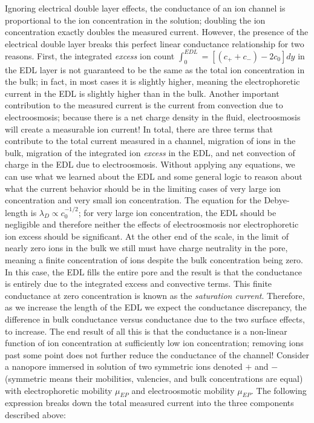 			Ignoring electrical double layer effects, the conductance of an ion channel is proportional to the ion concentration in the solution; doubling the ion concentration exactly doubles the measured current. However, the presence of the electrical double layer breaks this perfect linear conductance relationship for two reasons. First, the integrated \textit{excess} ion count $\int_{0}^{EDL}=\left[\left(c_{+}+c_{-}\right)-2c_{0}\right]dy$ in the EDL layer is not guaranteed to be the same as the total ion concentration in the bulk; in fact, in most cases it is slightly higher, meaning the electrophoretic current in the EDL is slightly higher than in the bulk. Another important contribution to the measured current is the current from convection due to electroosmosis; because there is a net charge density in the fluid, electroosmosis will create a measurable ion current! In total, there are three terms that contribute to the total current measured in a channel, migration of ions in the bulk, migration of the integrated ion \textit{excess} in the EDL, and net convection of charge in the EDL due to electroosmosis. Without applying any equations, we can use what we learned about the EDL and some general logic to reason about what the current behavior should be in the limiting cases of very large ion concentration and very small ion concentration. The equation for the Debye-length is $\lambda_{D}\propto c_{0}^{-1/2}$; for very large ion concentration, the EDL should be negligible and therefore neither the effects of electroosmosis nor electrophoretic ion excess should be significant. At the other end of the scale, in the limit of nearly zero ions in the bulk we still must have charge neutrality in the pore, meaning a finite concentration of ions despite the bulk concentration being zero. In this case, the EDL fills the entire pore and the result is that the conductance is entirely due to the integrated excess and convective terms. This finite conductance at zero concentration is known as the \textit{saturation current}. Therefore, as we increase the length of the EDL we expect the conductance discrepancy, the difference in bulk conductance versus conductance due to the two surface effects, to increase. The end result of all this is that the conductance is a non-linear function of ion concentration at sufficiently low ion concentration; removing ions past some point does not further reduce the conductance of the channel! Consider a nanopore immersed in solution of two symmetric ions denoted $+$ and $-$ (symmetric means their mobilities, valencies, and bulk concentrations are equal) with electrophoretic mobility $\mu_{EP}$ and electroosmotic mobility $\mu_{EP}$. The following expression breaks down the total measured current into the three components described above:
		
